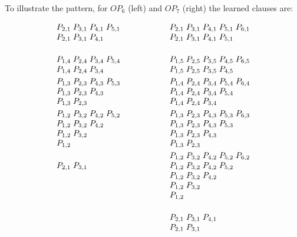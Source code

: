 \documentclass[10pt,a4paper]{article}
\begin{document}
To illustrate the pattern, for $OP_6$ (left) and $OP_7$ (right) the learned clauses are:

\[
\makebox[\textwidth][c]{$ %
\begin{array}{@{}l@{\qquad \qquad \qquad}l@{}}
\begin{array}[t]{@{}l@{}}
P_{2,1}\;P_{3,1}\;P_{4,1}\;P_{5,1}\\
P_{2,1}\;P_{3,1}\;P_{4,1}\\[15pt]
P_{1,4}\;P_{2,4}\;P_{3,4}\;P_{5,4}\\
P_{1,4}\;P_{2,4}\;P_{3,4}\\[3pt]
P_{1,3}\;P_{2,3}\;P_{4,3}\;P_{5,3}\\
P_{1,3}\;P_{2,3}\;P_{4,3}\\
P_{1,3}\;P_{2,3}\\[3pt]
P_{1,2}\;P_{3,2}\;P_{4,2}\;P_{5,2}\\
P_{1,2}\;P_{3,2}\;P_{4,2}\\
P_{1,2}\;P_{3,2}\\
P_{1,2}\\[15pt]
P_{2,1}\;P_{3,1}
\end{array}
&
\begin{array}[t]{@{}l@{}}
P_{2,1}\;P_{3,1}\;P_{4,1}\;P_{5,1}\;P_{6,1}\\
P_{2,1}\;P_{3,1}\;P_{4,1}\;P_{5,1}\\[15pt]
P_{1,5}\;P_{2,5}\;P_{3,5}\;P_{4,5}\;P_{6,5}\\
P_{1,5}\;P_{2,5}\;P_{3,5}\;P_{4,5}\\[3pt]
P_{1,4}\;P_{2,4}\;P_{3,4}\;P_{5,4}\;P_{6,4}\\
P_{1,4}\;P_{2,4}\;P_{3,4}\;P_{5,4}\\
P_{1,4}\;P_{2,4}\;P_{3,4}\\[3pt]
P_{1,3}\;P_{2,3}\;P_{4,3}\;P_{5,3}\;P_{6,3}\\
P_{1,3}\;P_{2,3}\;P_{4,3}\;P_{5,3}\\
P_{1,3}\;P_{2,3}\;P_{4,3}\\
P_{1,3}\;P_{2,3}\\[3pt]
P_{1,2}\;P_{3,2}\;P_{4,2}\;P_{5,2}\;P_{6,2}\\
P_{1,2}\;P_{3,2}\;P_{4,2}\;P_{5,2}\\
P_{1,2}\;P_{3,2}\;P_{4,2}\\
P_{1,2}\;P_{3,2}\\
P_{1,2}\\[15pt]
P_{2,1}\;P_{3,1}\;P_{4,1}\\
P_{2,1}\;P_{3,1}
\end{array}
\end{array}
$} %
\]
\end{document}
